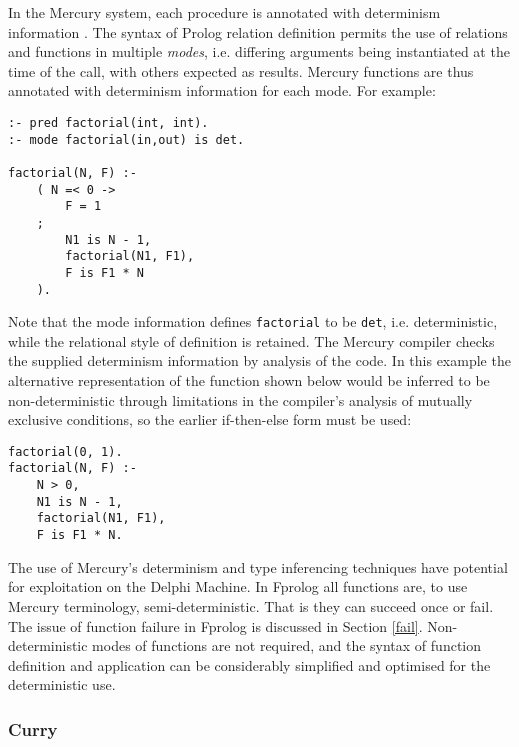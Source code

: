 \documentclass[a4paper,11pt,twoside]{article}
\begin{document}
In the Mercury system, each procedure is annotated with determinism
information \cite{HCSR95}. The syntax of Prolog relation definition
permits the use of relations and functions in multiple \textit{modes},
i.e. differing arguments being instantiated at the time of the call,
with others expected as results.  Mercury functions are thus annotated
with determinism information for each mode.
For example:
\begin{verbatim}
:- pred factorial(int, int).
:- mode factorial(in,out) is det.

factorial(N, F) :-
    ( N =< 0 ->
        F = 1
    ;
        N1 is N - 1,
        factorial(N1, F1),
        F is F1 * N
    ).
\end{verbatim}
Note that the mode information defines \texttt{factorial} to be
\texttt{det}, i.e. deterministic, while the relational style of 
definition is retained.
The Mercury compiler checks the supplied determinism information by
analysis of the code.  In this example the alternative representation of
the function shown below would be inferred to be non-deterministic through
limitations in the compiler's analysis of mutually exclusive conditions,
so the earlier if-then-else form must be used:
\begin{verbatim}
factorial(0, 1).
factorial(N, F) :-
    N > 0,
    N1 is N - 1,
    factorial(N1, F1),
    F is F1 * N.
\end{verbatim}
The use of Mercury's determinism and type inferencing techniques have
potential for exploitation on the Delphi Machine.  In Fprolog all
functions are, to use Mercury terminology, semi-deterministic.  That is
they can succeed once or fail.  The issue of function failure in Fprolog
is discussed in Section \ref{fail}.
Non-deterministic modes of functions are
not required, and the syntax of function definition and application can
be considerably simplified and optimised for the deterministic use.

\subsubsection{Curry}
\end{document}
